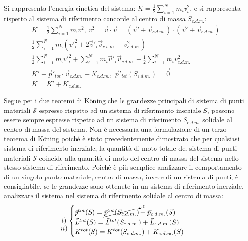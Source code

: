 \documentclass{article}
\numberwithin{equation}{subsection}
\begin{document}
Si rappresenta l'energia cinetica del sistema:
$K=\displaystyle\frac{1}{2}\sum_{i=1}^{N}m_iv_i^{2}$, e 
si rappresenta rispetto al sistema di riferimento concorde al 
centro di massa $S_{c.d.m.}$:
\begin{gather*}
    K=\displaystyle\frac{1}{2}\sum_{i=1}^{N}m_iv^{2},\:v^{2}=\vec{v}\cdot\vec{v}=(\vec{v}'+\vec{v}_{c.d.m.})\cdot(\vec{v}'+\vec{v}_{c.d.m.})\\
    \displaystyle\frac{1}{2}\sum_{i=1}^{N}m_i(v'^{2}_i+2\vec{v}'_i\vec{v}_{c.d.m.}+v_{c.d.m.}^{2})\\
    \displaystyle\frac{1}{2}\displaystyle\sum_{i=1}^{N}m_iv'^{2}_i+\displaystyle\sum_{i=1}^{N}m_i\vec{v}'_i\vec{v}_{c.d.m.}+\frac{1}{2}\displaystyle\sum_{i=1}^{N}m_iv_{c.d.m.}^{2}\\
    K'+\vec{p}'_{tot}\cdot\vec{v}_{c.d.m.}+K_{c.d.m.},\:\vec{p}'_{tot}(S_{c.d.m.})=\vec{0}\\
    K=K'+K_{c.d.m.}
\end{gather*}

Segue per i due teoremi di K\"oning che le grandezze principali di sistema di punti materiali $\mathscr{S}$ espresso rispetto ad 
un sistema di riferimento inerziale $S$, possono essere sempre espresse 
rispetto ad un sistema di riferimento $S_{c.d.m.}$ solidale al centro di massa del sistema. Non è necessaria una formulazione di un terzo teorema di K\"oning poiché 
è stato precedentemente dimostrato che per qualsiasi sistema di riferimento inerziale, la quantità di moto totale del sistema di punti materiali $\mathscr{S}$ coincide 
alla quantità di moto del centro di massa del sistema nello stesso sistema di riferimento. Poiché è più semplice analizzare il comportamento di un singolo punto materiale, 
centro di massa, 
invece di un sistema di punti, è consigliabile, se le grandezze sono ottenute in un sistema di riferimento inerziale, analizzare il sistema nel sistema di riferimento 
solidale al centro di massa: 
\begin{equation}
    \begin{matrix}
        \\
        i)
        \\
        ii)
    \end{matrix}
    \begin{cases}
        \vec{p}^{tot}(S)=\cancelto{0}{\vec p^{tot}(S_{c.d.m.})}+\vec{p}_{c.d.m.}(S)\\
        \vec{L}^{tot}(S)=\vec{L}^{tot}(S_{c.d.m.})+\vec{L}_{c.d.m.}(S)\\
        K^{tot}(S)=K^{tot}(S_{c.d.m.})+K_{c.d.m.}(S)
    \end{cases}
\end{equation}
\end{document}
